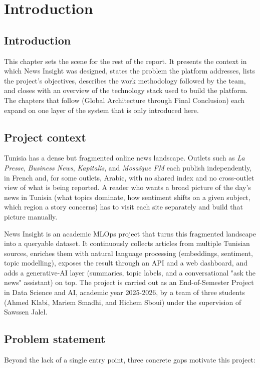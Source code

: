 \chapter{Introduction}

\section{Introduction}
This chapter sets the scene for the rest of the report. It presents the context in which News Insight was designed, states the problem the platform addresses, lists the project's objectives, describes the work methodology followed by the team, and closes with an overview of the technology stack used to build the platform. The chapters that follow (Global Architecture through Final Conclusion) each expand on one layer of the system that is only introduced here.

\section{Project context}
Tunisia has a dense but fragmented online news landscape. Outlets such as \textit{La Presse}, \textit{Business News}, \textit{Kapitalis}, and \textit{Mosaïque FM} each publish independently, in French and, for some outlets, Arabic, with no shared index and no cross-outlet view of what is being reported. A reader who wants a broad picture of the day's news in Tunisia (what topics dominate, how sentiment shifts on a given subject, which region a story concerns) has to visit each site separately and build that picture manually.

News Insight is an academic MLOps project that turns this fragmented landscape into a queryable dataset. It continuously collects articles from multiple Tunisian sources, enriches them with natural language processing (embeddings, sentiment, topic modelling), exposes the result through an API and a web dashboard, and adds a generative-AI layer (summaries, topic labels, and a conversational "ask the news" assistant) on top. The project is carried out as an End-of-Semester Project in Data Science and AI, academic year 2025-2026, by a team of three students (Ahmed Klabi, Mariem Smadhi, and Hichem Sboui) under the supervision of Sawssen Jalel.

\section{Problem statement}
Beyond the lack of a single entry point, three concrete gaps motivate this project:

